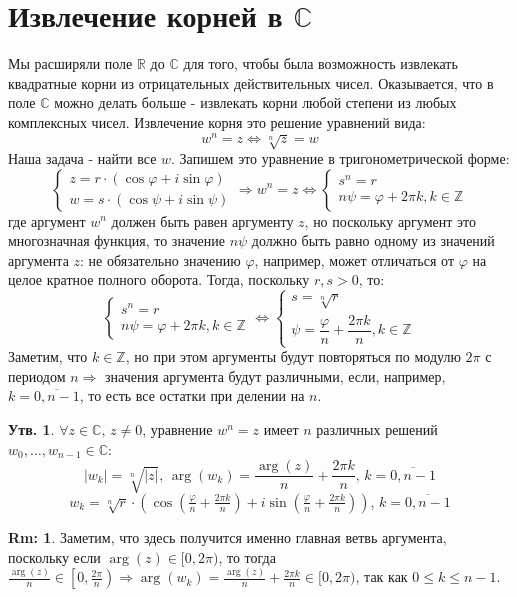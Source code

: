 \documentclass[12pt]{article}
\newcommand{\MR}{\mathbb{R}}
\newcommand{\MC}{\mathbb{C}}
\newcommand{\MZ}{\mathbb{Z}}
\theoremstyle{definition}
\newtheorem{rem}{Rm:}
\newtheorem{prop}{Утв.}
\begin{document}
\section*{Извлечение корней в $\MC$}
Мы расширяли поле $\MR$ до $\MC$ для того, чтобы была возможность извлекать квадратные корни из отрицательных действительных чисел. Оказывается, что в поле $\MC$ можно делать больше - извлекать корни любой степени из любых комплексных чисел. Извлечение корня это решение уравнений вида:
$$
	w^n = z \Leftrightarrow \sqrt[n]{z} = w
$$
Наша задача - найти все $w$. Запишем это уравнение в тригонометрической форме:
$$
	\begin{cases}
		z = r{\cdot}(\cos\varphi + i \sin \varphi)\\
		w = s{\cdot}(\cos\psi + i \sin\psi)
	\end{cases} \Rightarrow
	w^n = z \Leftrightarrow 
	\begin{cases}
		s^n = r\\
		n\psi = \varphi + 2\pi k, k \in \MZ
	\end{cases}
$$
где аргумент $w^n$ должен быть равен аргументу $z$, но поскольку аргумент это многозначная функция, то значение $n\psi$ должно быть равно одному из значений  аргумента $z$: не обязательно значению $\varphi$, например, может отличаться от $\varphi$ на целое кратное полного оборота. Тогда, поскольку $r,s > 0$, то:
$$
	\begin{cases}
		s^n = r\\
		n\psi = \varphi + 2\pi k, k \in \MZ
	\end{cases} \Leftrightarrow
	\begin{cases}
		s = \sqrt[n]{r}\\
		\psi = \dfrac{\varphi}{n} + \dfrac{2\pi k}{n}, k \in \MZ
	\end{cases}
$$
Заметим, что $k \in \MZ$, но при этом аргументы будут повторяться по модулю $2\pi$ с периодом $n \Rightarrow$ значения аргумента будут различными, если, например, $k = \overline{0, n-1}$, то есть все остатки при делении на $n$.

\begin{prop}
	$\forall z \in \MC, \, z \neq 0$, уравнение $w^n = z$ имеет $n$ различных решений $w_0, \dotsc, w_{n-1} \in \MC$:
	$$
		|w_k| = \sqrt[n]{|z|}, \, \arg(w_k) = \dfrac{\arg(z)}{n} + \dfrac{2\pi k}{n}, \, k = \overline{0,n-1}
	$$
	$$
		w_k = \sqrt[n]{r}{\cdot}\left(\cos\left(\tfrac{\varphi}{n} + \tfrac{2\pi k}{n}\right) + i \sin\left(\tfrac{\varphi}{n} + \tfrac{2\pi k}{n}\right) \right), \, k = \overline{0,n-1}
	$$
\end{prop}
\begin{rem}
	Заметим, что здесь получится именно главная ветвь аргумента, поскольку если $\arg(z) \in [0,2\pi)$, то тогда $\tfrac{\arg(z)}{n} \in \left[0,\tfrac{2\pi}{n}\right) \Rightarrow \arg(w_k)= \tfrac{\arg(z)}{n} + \tfrac{2\pi k}{n} \in [0, 2\pi)$, так как $0 \leq k \leq n-1$. 
\end{rem}
\end{document}
